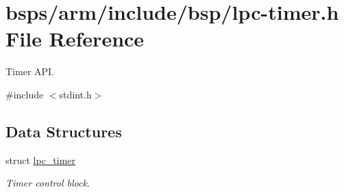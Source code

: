 \hypertarget{lpc-timer_8h}{}\section{bsps/arm/include/bsp/lpc-\/timer.h File Reference}
\label{lpc-timer_8h}


Timer A\+PI.  


{\ttfamily \#include $<$stdint.\+h$>$}\newline
\subsection*{Data Structures}
\begin{DoxyCompactItemize}
\item 
struct \mbox{\hyperlink{structlpc__timer}{lpc\+\_\+timer}}
\begin{DoxyCompactList}\small\item\em Timer control block. \end{DoxyCompactList}\end{DoxyCompactItemize}
